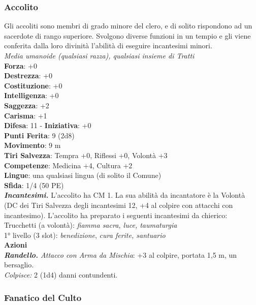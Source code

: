 \begin{multicols}{2}
\subsubsection{Accolito}

Gli accoliti sono membri di grado minore del clero, e di solito rispondono ad un sacerdote di rango superiore. Svolgono diverse funzioni in un tempio e gli viene conferita dalla loro divinità l'abilità di eseguire incantesimi minori.\\
\emph{Media umanoide (qualsiasi razza), qualsiasi insieme di Tratti}\\
\textbf{Forza}: +0\\
\textbf{Destrezza}: +0\\
\textbf{Costituzione}: +0\\
\textbf{Intelligenza}: +0\\
\textbf{Saggezza}: +2\\
\textbf{Carisma}: +1\\
\textbf{Difesa}: 11 - \textbf{Iniziativa}: +0\\
\textbf{Punti Ferita}: 9 (2d8)\\
\textbf{Movimento}: 9 m\\
\textbf{Tiri Salvezza}: Tempra +0, Riflessi +0, Volontà +3 \\
\textbf{Competenze}: Medicina +4, Cultura +2\\
\textbf{Lingue}: una qualsiasi lingua (di solito il Comune)\\
\textbf{Sfida}: 1/4 (50 PE)\smallskip\\
\emph{\textbf{Incantesimi.}} L'accolito ha CM 1. La sua abilità da incantatore è la Volontà (DC dei Tiri Salvezza degli incantesimi 12, +4 al colpire con attacchi con incantesimo). L'accolito ha preparato i seguenti incantesimi da chierico:\\
Trucchetti (a volontà): \emph{fiamma sacra, luce, taumaturgia} \\
1° livello (3 slot): \emph{benedizione}, \emph{cura ferite, santuario}\\
\smallskip\textbf{Azioni}\\
\emph{\textbf{Randello.} Attacco con Arma da Mischia}: +3 al colpire, portata 1,5 m, un bersaglio.\\
\emph{Colpisce:} 2 (1d4) danni contundenti.\\

\subsubsection{Fanatico del Culto}


\end{multicols}
